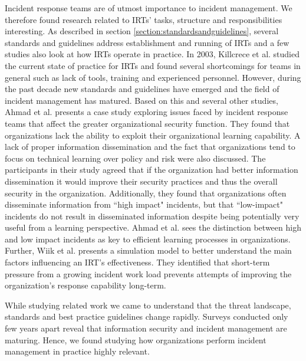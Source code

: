 Incident response teams are of utmost importance to incident management. We therefore found research related to \acp{IRT}' tasks, structure and responsibilities interesting. As described in section \ref{section:standardsandguidelines}, several standards and guidelines address establishment and running of \acp{IRT} and a few studies also look at how \acp{IRT} operate in practice. In 2003, Killcrece et al. \cite{killcrece2003state} studied the current state of practice for \acp{IRT} and found several shortcomings for teams in general such as lack of tools, training and experienced personnel. However, during the past decade new standards and guidelines have emerged and the field of incident management has matured.  Based on this and several other studies, Ahmad et al. \cite{ahmad2012incident} presents a case study exploring issues faced by incident response teams that affect the greater organizational security function. They found that organizations lack the ability to exploit their organizational learning capability. A lack of proper information dissemination and the fact that organizations tend to focus on technical learning over policy and risk were also discussed. The participants in their study agreed that if the organization had better information dissemination it would improve their security practices and thus the overall security in the organization. Additionally, they found that organizations often disseminate information from ``high impact" incidents, but that ``low-impact" incidents do not result in disseminated information despite being potentially very useful from a learning perspective. Ahmad et al. sees the distinction between high and low impact incidents as key to efficient learning processes in organizations. Further, Wiik et al. \cite{gonzalezlimits} presents a simulation model to better understand the main factors influencing an \ac{IRT}'s effectiveness. They identified that short-term pressure from a growing incident work load prevents attempts of improving the organization's response capability long-term. 

While studying related work we came to understand that the threat landscape, standards and best practice guidelines change rapidly. Surveys conducted only few years apart reveal that information security and incident management are maturing. Hence, we found studying how organizations perform incident management in practice highly relevant. 

